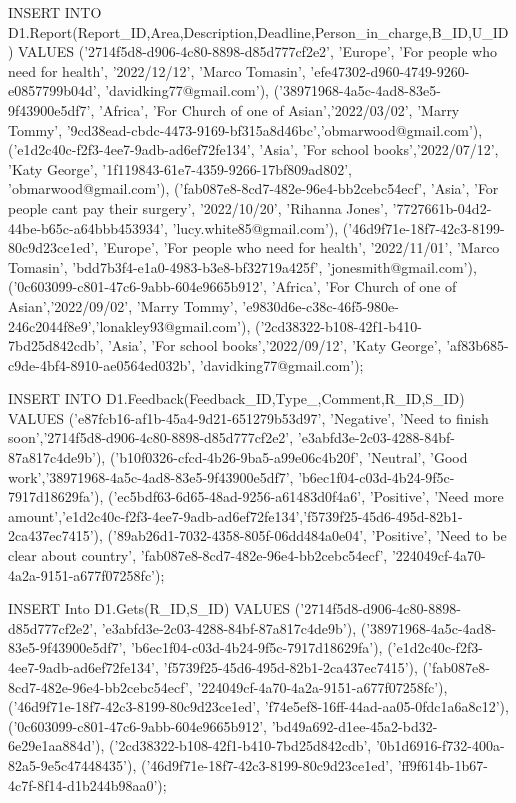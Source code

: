 INSERT INTO D1.Report(Report_ID,Area,Description,Deadline,Person_in_charge,B_ID,U_ID) VALUES
('2714f5d8-d906-4c80-8898-d85d777cf2e2', 'Europe', 'For people who need for health', '2022/12/12', 'Marco Tomasin', 'efe47302-d960-4749-9260-e0857799b04d', 'davidking77@gmail.com'),
('38971968-4a5c-4ad8-83e5-9f43900e5df7', 'Africa', 'For Church of one of Asian','2022/03/02', 'Marry Tommy', '9cd38ead-cbdc-4473-9169-bf315a8d46bc','obmarwood@gmail.com'),
('e1d2c40c-f2f3-4ee7-9adb-ad6ef72fe134', 'Asia', 'For school books','2022/07/12', 'Katy George', '1f119843-61e7-4359-9266-17bf809ad802', 'obmarwood@gmail.com'),
('fab087e8-8cd7-482e-96e4-bb2cebc54ecf', 'Asia', 'For people cant pay their surgery', '2022/10/20', 'Rihanna Jones', '7727661b-04d2-44be-b65c-a64bbb453934', 'lucy.white85@gmail.com'),
('46d9f71e-18f7-42c3-8199-80c9d23ce1ed', 'Europe', 'For people who need for health', '2022/11/01',  'Marco Tomasin', 'bdd7b3f4-e1a0-4983-b3e8-bf32719a425f', 'jonesmith@gmail.com'),
('0c603099-c801-47c6-9abb-604e9665b912', 'Africa', 'For Church of one of Asian','2022/09/02', 'Marry Tommy', 'e9830d6e-c38c-46f5-980e-246c2044f8e9','lonakley93@gmail.com'),
('2cd38322-b108-42f1-b410-7bd25d842cdb', 'Asia', 'For school books','2022/09/12',  'Katy George', 'af83b685-c9de-4bf4-8910-ae0564ed032b', 'davidking77@gmail.com');



INSERT INTO D1.Feedback(Feedback_ID,Type_,Comment,R_ID,S_ID) VALUES
('e87fcb16-af1b-45a4-9d21-651279b53d97', 'Negative', 'Need to finish soon','2714f5d8-d906-4c80-8898-d85d777cf2e2', 'e3abfd3e-2c03-4288-84bf-87a817c4de9b'),
('b10f0326-cfcd-4b26-9ba5-a99e06c4b20f', 'Neutral', 'Good work','38971968-4a5c-4ad8-83e5-9f43900e5df7',  'b6ec1f04-c03d-4b24-9f5c-7917d18629fa'),
('ec5bdf63-6d65-48ad-9256-a61483d0f4a6', 'Positive', 'Need more amount','e1d2c40c-f2f3-4ee7-9adb-ad6ef72fe134','f5739f25-45d6-495d-82b1-2ca437ec7415'),
('89ab26d1-7032-4358-805f-06dd484a0e04', 'Positive', 'Need to be clear about country', 'fab087e8-8cd7-482e-96e4-bb2cebc54ecf', '224049cf-4a70-4a2a-9151-a677f07258fc');


INSERT Into D1.Gets(R_ID,S_ID) VALUES
('2714f5d8-d906-4c80-8898-d85d777cf2e2', 'e3abfd3e-2c03-4288-84bf-87a817c4de9b'),
('38971968-4a5c-4ad8-83e5-9f43900e5df7', 'b6ec1f04-c03d-4b24-9f5c-7917d18629fa'),
('e1d2c40c-f2f3-4ee7-9adb-ad6ef72fe134', 'f5739f25-45d6-495d-82b1-2ca437ec7415'),
('fab087e8-8cd7-482e-96e4-bb2cebc54ecf', '224049cf-4a70-4a2a-9151-a677f07258fc'),
('46d9f71e-18f7-42c3-8199-80c9d23ce1ed', 'f74e5ef8-16ff-44ad-aa05-0fdc1a6a8c12'),
('0c603099-c801-47c6-9abb-604e9665b912', 'bd49a692-d1ee-45a2-bd32-6e29e1aa884d'),
('2cd38322-b108-42f1-b410-7bd25d842cdb', '0b1d6916-f732-400a-82a5-9e5c47448435'),
('46d9f71e-18f7-42c3-8199-80c9d23ce1ed', 'ff9f614b-1b67-4c7f-8f14-d1b244b98aa0');